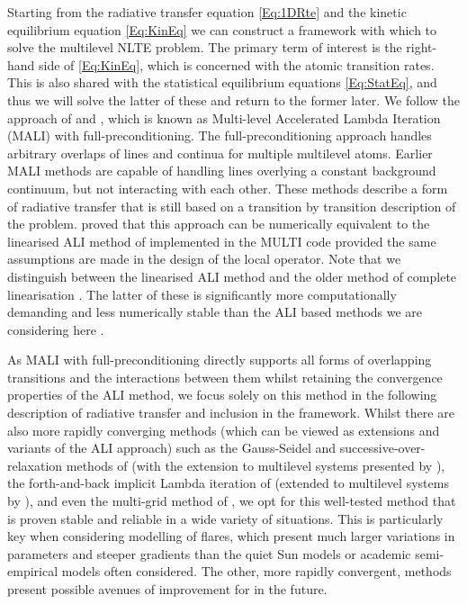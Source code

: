Starting from the radiative transfer equation \eqref{Eq:1DRte} and the kinetic equilibrium equation \eqref{Eq:KinEq} we can construct a framework with which to solve the multilevel NLTE problem.
The primary term of interest is the right-hand side of \eqref{Eq:KinEq}, which is concerned with the atomic transition rates.
This is also shared with the statistical equilibrium equations \eqref{Eq:StatEq}, and thus we will solve the latter of these and return to the former later.
We follow the approach of \citet{Rybicki1992} and \citet{Uitenbroek2001}, which is known as Multi-level Accelerated Lambda Iteration (MALI) with full-preconditioning.
The full-preconditioning approach handles arbitrary overlaps of lines and continua for multiple multilevel atoms.
Earlier MALI methods \citep{Rybicki1991} are capable of handling lines overlying a constant background continuum, but not interacting with each other.
These methods describe a form of radiative transfer that is still based on a transition by transition description of the problem.
\citet{SocasNavarro1997} proved that this approach can be numerically equivalent to the linearised ALI method of \citet{Scharmer1985} implemented in the MULTI code \citep{Carlsson1986,Carlsson1992} provided the same assumptions are made in the design of the local operator.
Note that we distinguish between the linearised ALI method and the older method of complete linearisation \citep[e.g. ][]{Auer1969, Auer1973, Auer1976}.
The latter of these is significantly more computationally demanding and less numerically stable than the ALI based methods we are considering here \citep[a comparison of MULTI and LINEAR-B is shown in][]{Carlsson1986}.

As MALI with full-preconditioning directly supports all forms of overlapping transitions and the interactions between them whilst retaining the convergence properties of the ALI method, we focus solely on this method in the following description of radiative transfer and inclusion in the \Lw{} framework.
Whilst there are also more rapidly converging methods (which can be viewed as extensions and variants of the ALI approach) such as the Gauss-Seidel and successive-over-relaxation methods of \citet{TrujilloBueno1995} (with the extension to multilevel systems presented by \citet{Paletou2007}), the forth-and-back implicit Lambda iteration of \citet{AtanackovicVukmanovic1997} (extended to multilevel systems by \citet{Kuzmanovska2017}), and even the multi-grid method of \citet{FabianiBendicho1997}, we opt for this well-tested method that is proven stable and reliable in a wide variety of situations.
This is particularly key when considering modelling of flares, which present much larger variations in parameters and steeper gradients than the quiet Sun models or academic semi-empirical models often considered.
The other, more rapidly convergent, methods present possible avenues of improvement for \Lw{} in the future.

